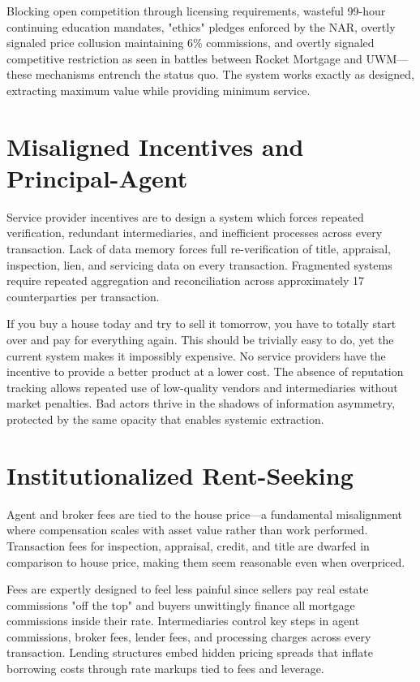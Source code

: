 Blocking open competition through licensing requirements, wasteful 99-hour continuing education mandates, "ethics" pledges enforced by the NAR, overtly signaled price collusion maintaining 6\% commissions, and overtly signaled competitive restriction as seen in battles between Rocket Mortgage and UWM—these mechanisms entrench the status quo. The system works exactly as designed, extracting maximum value while providing minimum service.

\section{Misaligned Incentives and Principal-Agent}

Service provider incentives are to design a system which forces repeated verification, redundant intermediaries, and inefficient processes across every transaction. Lack of data memory forces full re-verification of title, appraisal, inspection, lien, and servicing data on every transaction. Fragmented systems require repeated aggregation and reconciliation across approximately 17 counterparties per transaction.

If you buy a house today and try to sell it tomorrow, you have to totally start over and pay for everything again. This should be trivially easy to do, yet the current system makes it impossibly expensive. No service providers have the incentive to provide a better product at a lower cost. The absence of reputation tracking allows repeated use of low-quality vendors and intermediaries without market penalties. Bad actors thrive in the shadows of information asymmetry, protected by the same opacity that enables systemic extraction.

\section{Institutionalized Rent-Seeking}

Agent and broker fees are tied to the house price—a fundamental misalignment where compensation scales with asset value rather than work performed. Transaction fees for inspection, appraisal, credit, and title are dwarfed in comparison to house price, making them seem reasonable even when overpriced. 

Fees are expertly designed to feel less painful since sellers pay real estate commissions "off the top" and buyers unwittingly finance all mortgage commissions inside their rate. Intermediaries control key steps in agent commissions, broker fees, lender fees, and processing charges across every transaction. Lending structures embed hidden pricing spreads that inflate borrowing costs through rate markups tied to fees and leverage.

